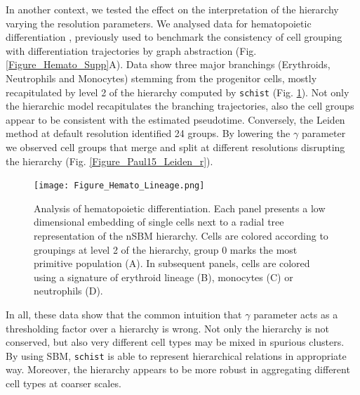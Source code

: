 \documentclass[10pt]{article}
\begin{document}
In another context, we tested the effect on the interpretation of the hierarchy varying the resolution parameters. We analysed data for hematopoietic differentiation \cite{paul_2015}, previously used to benchmark the consistency of cell grouping with differentiation trajectories by graph abstraction \cite{wolf_2019} (Fig. \ref{Figure_Hemato_Supp}A). Data show three major branchings (Erythroids, Neutrophils and Monocytes) stemming from the progenitor cells, mostly recapitulated by level 2 of the hierarchy computed by \texttt{schist} (Fig. \ref{Figure_Hemato_Lineage}). Not only the hierarchic model recapitulates the branching trajectories, also the cell groups appear to be consistent with the estimated pseudotime. Conversely, the Leiden method at default resolution identified 24 groups. By lowering the $\gamma$ parameter we observed cell groups that merge and split at different resolutions disrupting the hierarchy (Fig. \ref{Figure_Paul15_Leiden_r}). 


\begin{figure}[H]
\centering
\texttt{[image: Figure\_Hemato\_Lineage.png]}
\caption[]{Analysis of hematopoietic differentiation. Each panel presents a low dimensional embedding of single cells next to a radial tree representation of the nSBM hierarchy. Cells are colored according to groupings at level 2 of the hierarchy, group 0 marks the most primitive population (A). In subsequent panels, cells are colored using a signature of erythroid lineage (B), monocytes (C) or neutrophils (D).}\label{Figure_Hemato_Lineage}
\end{figure}

In all, these data show that the common intuition that $\gamma$ parameter acts as a thresholding factor over a hierarchy is wrong. Not only the hierarchy is not conserved, but also very different cell types may be mixed in spurious clusters. By using SBM, \texttt{schist} is able to represent hierarchical relations in appropriate way. Moreover, the hierarchy appears to be more robust in aggregating different cell types at coarser scales.


\end{document}
